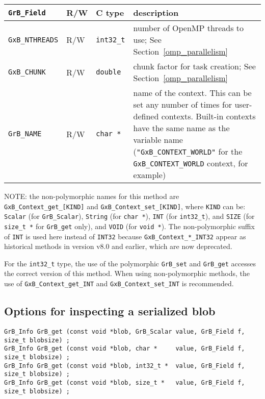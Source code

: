 \noindent
{\small
\begin{tabular}{|l|l|l|p{3.5in}|}
\hline
\verb'GrB_Field'                    & R/W  & C type        & description \\
\hline
\verb'GxB_NTHREADS' & R/W & \verb'int32_t' & number of OpenMP threads to use;
    See Section~\ref{omp_parallelism} \\
\verb'GxB_CHUNK'    & R/W & \verb'double' & chunk factor for task creation;
    See Section~\ref{omp_parallelism} \\
\hline
\verb'GrB_NAME'         & R/W  & \verb'char *' & name of the context.
    This can be set any number of times for user-defined contexts.  Built-in
    contexts have the same name as the variable name (\verb'"GxB_CONTEXT_WORLD"'
    for the \verb'GxB_CONTEXT_WORLD' context, for example) \\
\hline
\end{tabular}
}

NOTE: the non-polymorphic names for this method are
\verb'GxB_Context_get_[KIND]' and \verb'GxB_Context_set_[KIND]', where
\verb'KIND' can be:
    \verb'Scalar' (for \verb'GrB_Scalar'),
    \verb'String' (for \verb'char *'),
    \verb'INT' (for \verb'int32_t'), and
    \verb'SIZE' (for \verb'size_t *' for \verb'GrB_get' only), and
    \verb'VOID' (for \verb'void *').
The non-polymorphic suffix of \verb'INT' is used here instead of
\verb'INT32' because \verb'GxB_Context_*_INT32' appear as historical methods
in version v8.0 and earlier, which are now deprecated.

For the \verb'int32_t' type, the use of the polymorphic \verb'GrB_set' and
\verb'GrB_get' accesses the correct version of this method.  When using
non-polymorphic methods, the use of \verb'GxB_Context_get_INT' and
\verb'GxB_Context_set_INT' is recommended.

\newpage
\subsection{Options for inspecting a serialized blob}
\label{get_set_blob}

\begin{mdframed}[userdefinedwidth=6.5in]
{\footnotesize
\begin{verbatim}
GrB_Info GrB_get (const void *blob, GrB_Scalar value, GrB_Field f, size_t blobsize) ;
GrB_Info GrB_get (const void *blob, char *     value, GrB_Field f, size_t blobsize) ;
GrB_Info GrB_get (const void *blob, int32_t *  value, GrB_Field f, size_t blobsize) ;
GrB_Info GrB_get (const void *blob, size_t *   value, GrB_Field f, size_t blobsize) ;
\end{verbatim}
}\end{mdframed}

